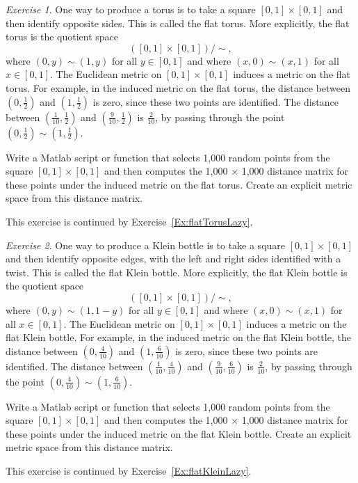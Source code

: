 \documentclass[amscd, amssymb, verbatim]{amsart}[12pt]
\theoremstyle{remark}
\newtheorem{exercise}{Exercise}
\theoremstyle{remark}
\theoremstyle{remark}
\begin{document}
\begin{exercise}\label{Ex:flatTorus}
One way to produce a torus is to take a square $[0, 1] \times [0, 1]$ and then identify opposite sides. This is called the flat torus. More explicitly, the flat torus is the quotient space
$$([0, 1] \times [0, 1]) / \sim,$$
where $(0, y) \sim (1, y)$ for all $y \in [0, 1]$ and where $(x, 0) \sim (x, 1)$ for all $x \in [0, 1]$. The Euclidean metric on $[0, 1] \times [0, 1]$ induces a metric on the flat torus. For example, in the induced metric on the flat torus, the distance between $(0, \frac{1}{2})$ and $(1, \frac{1}{2})$ is zero, since these two points are identified. The distance between $(\frac{1}{10}, \frac{1}{2})$ and $(\frac{9}{10}, \frac{1}{2})$ is $\frac{2}{10}$, by passing through the point $(0, \frac{1}{2}) \sim (1, \frac{1}{2})$.

Write a Matlab script or function that selects 1,000 random points from the square $[0, 1] \times [0, 1]$ and then computes the 1,000 $\times$ 1,000 distance matrix for these points under the induced metric on the flat torus. Create an explicit metric space from this distance matrix. 

This exercise is continued by Exercise~\ref{Ex:flatTorusLazy}. 

\end{exercise}

\begin{exercise}\label{Ex:flatKlein}
One way to produce a Klein bottle is to take a square $[0, 1] \times [0, 1]$ and then identify opposite edges, with the left and right sides identified with a twist. This is called the flat Klein bottle. More explicitly, the flat Klein bottle is the quotient space 
$$([0, 1] \times [0, 1]) / \sim,$$
where $(0, y) \sim (1, 1 - y)$ for all $y \in [0, 1]$ and where $(x, 0) \sim (x, 1)$ for all $x \in [0, 1]$. The Euclidean metric on $[0, 1] \times [0, 1]$ induces a metric on the flat Klein bottle. For example, in the induced metric on the flat Klein bottle, the distance between $(0, \frac{4}{10})$ and $(1, \frac{6}{10})$ is zero, since these two points are identified. The distance between $(\frac{1}{10}, \frac{4}{10})$ and $(\frac{9}{10}, \frac{6}{10})$ is $\frac{2}{10}$, by passing through the point $(0, \frac{4}{10}) \sim (1, \frac{6}{10})$.

Write a Matlab script or function that selects 1,000 random points from the square $[0, 1] \times [0, 1]$ and then computes the 1,000 $\times$ 1,000 distance matrix for these points under the induced metric on the flat Klein bottle. Create an explicit metric space from this distance matrix. 

This exercise is continued by Exercise~\ref{Ex:flatKleinLazy}. 
\end{exercise}
\end{document}
